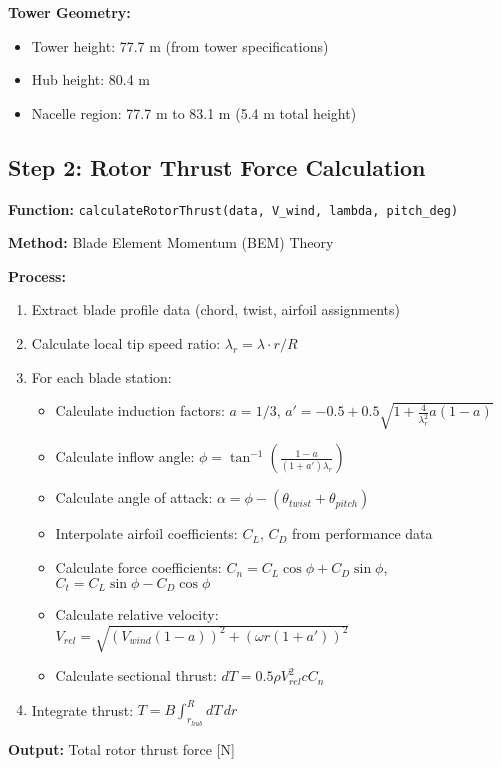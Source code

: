 \documentclass[11pt]{article}
\begin{document}
\textbf{Tower Geometry:}
\begin{itemize}
    \item Tower height: 77.7 m (from tower specifications)
    \item Hub height: 80.4 m
    \item Nacelle region: 77.7 m to 83.1 m (5.4 m total height)
\end{itemize}

\subsection{Step 2: Rotor Thrust Force Calculation}
\textbf{Function:} \texttt{calculateRotorThrust(data, V\_wind, lambda, pitch\_deg)}

\textbf{Method:} Blade Element Momentum (BEM) Theory

\textbf{Process:}
\begin{enumerate}
    \item Extract blade profile data (chord, twist, airfoil assignments)
    \item Calculate local tip speed ratio: $\lambda_r = \lambda \cdot r/R$
    \item For each blade station:
    \begin{itemize}
        \item Calculate induction factors: $a = 1/3$, $a' = -0.5 + 0.5\sqrt{1 + \frac{4}{\lambda_r^2}a(1-a)}$
        \item Calculate inflow angle: $\phi = \tan^{-1}\left(\frac{1-a}{(1+a')\lambda_r}\right)$
        \item Calculate angle of attack: $\alpha = \phi - (\theta_{twist} + \theta_{pitch})$
        \item Interpolate airfoil coefficients: $C_L$, $C_D$ from performance data
        \item Calculate force coefficients: $C_n = C_L\cos\phi + C_D\sin\phi$, $C_t = C_L\sin\phi - C_D\cos\phi$
        \item Calculate relative velocity: $V_{rel} = \sqrt{(V_{wind}(1-a))^2 + (\omega r(1+a'))^2}$
        \item Calculate sectional thrust: $dT = 0.5\rho V_{rel}^2 c C_n$
    \end{itemize}
    \item Integrate thrust: $T = B \int_{r_{hub}}^{R} dT \, dr$
\end{enumerate}

\textbf{Output:} Total rotor thrust force [N]
\end{document}

